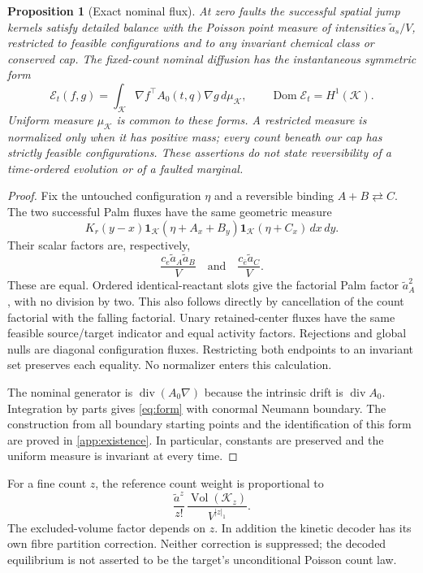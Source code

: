 \documentclass[11pt]{article}
\numberwithin{equation}{section}
\newtheorem{proposition}[theorem]{Proposition}
\theoremstyle{definition}
\theoremstyle{remark}\newtheorem{remark}[theorem]{Remark}
\newcommand{\Vol}{\operatorname{Vol}}
\newcommand{\K}{\mathcal K}
\newcommand{\cE}{\mathcal E}
\newcommand{\ind}{\mathbf 1}
\newcommand{\dd}{\,d}
\begin{document}
\begin{proposition}[Exact nominal flux]\label{prop:balance}
At zero faults the successful spatial jump kernels satisfy detailed balance
with the Poisson point measure of intensities $\widetilde a_s/V$, restricted
to feasible configurations and to any invariant chemical class or conserved
cap. The fixed-count nominal diffusion has the instantaneous symmetric form
\begin{equation}\label{eq:form}
 \cE_t(f,g)=\int_\K\nabla f^\top A_0(t,q)\nabla g\dd\mu_\K,
 \qquad \operatorname{Dom}\cE_t=H^1(\K).
\end{equation}
Uniform measure $\mu_\K$ is common to these forms. A restricted measure is
normalized only when it has positive mass; every count beneath our cap
has strictly feasible configurations. These assertions do not state
reversibility of a time-ordered evolution or of a faulted marginal.
\end{proposition}
\begin{proof}
Fix the untouched configuration $\eta$ and a reversible binding
$A+B\rightleftarrows C$. The two successful Palm fluxes have the same
geometric measure
\[
 K_r(y-x)\ind_{\K}(\eta+A_x+B_y)
             \ind_{\K}(\eta+C_x)\dd x\dd y.
\]
Their scalar factors are, respectively,
\[
 \frac{c_e\widetilde a_A\widetilde a_B}{V}
 \quad\text{and}\quad\frac{c_{\bar e}\widetilde a_C}{V}.
\]
These are equal. Ordered identical-reactant slots give the factorial Palm
factor $\widetilde a_A^2$, with no division by two. This also follows directly
by cancellation of the count factorial with the falling factorial.
Unary retained-center fluxes have the same feasible source/target indicator
and equal activity factors. Rejections and global nulls are diagonal
configuration fluxes. Restricting both endpoints to an invariant set
preserves each equality. No normalizer enters this calculation.

The nominal generator is
$\operatorname{div}(A_0\nabla)$ because the intrinsic drift is
$\operatorname{div}A_0$. Integration by parts gives \eqref{eq:form} with
conormal Neumann boundary. The construction from all boundary starting
points and the identification of this form are proved in
\cref{app:existence}. In particular, constants are preserved and the
uniform measure is invariant at every time.
\end{proof}

For a fine count $z$, the reference count weight is proportional to
\begin{equation}\label{eq:countweight}
 \frac{\widetilde a^z}{z!}\,
 \frac{\Vol(\K_z)}{V^{|z|_1}}.
\end{equation}
The excluded-volume factor depends on $z$. In addition the kinetic decoder
has its own fibre partition correction. Neither correction is suppressed;
the decoded equilibrium is not asserted to be the target's unconditional
Poisson count law.
\end{document}
